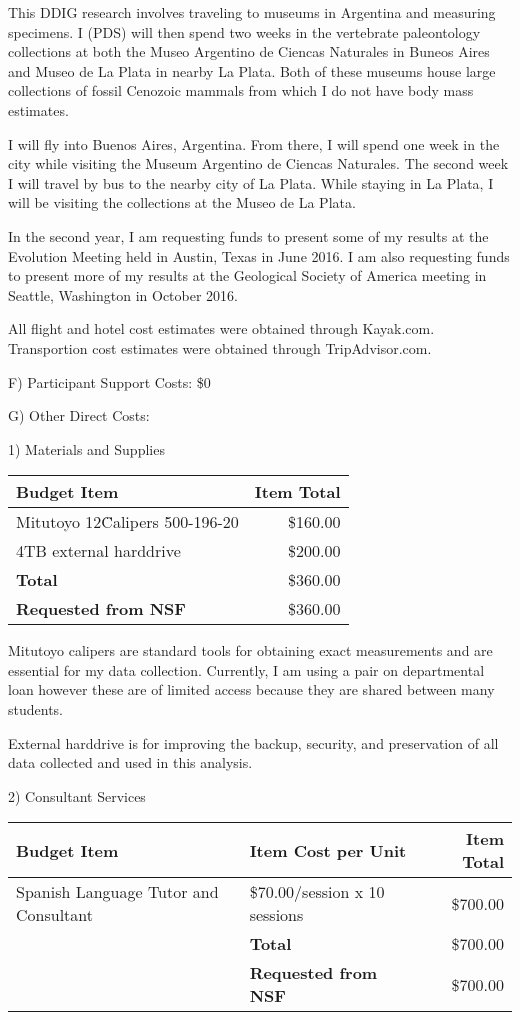 \documentclass[11pt,letterpaper]{article}
\begin{document}
This DDIG research involves traveling to museums in Argentina and measuring specimens. I (PDS) will then spend two weeks in the vertebrate paleontology collections at both the Museo Argentino de Ciencas Naturales in Buneos Aires and Museo de La Plata in nearby La Plata. Both of these museums house large collections of fossil Cenozoic mammals from which I do not have body mass estimates.

I will fly into Buenos Aires, Argentina. From there, I will spend one week in the city while visiting the Museum Argentino de Ciencas Naturales. The second week I will travel by bus to the nearby city of La Plata. While staying in La Plata, I will be visiting the collections at the Museo de La Plata. 

In the second year, I am requesting funds to present some of my results at the Evolution Meeting held in Austin, Texas in June 2016. I am also requesting funds to present more of my results at the Geological Society of America meeting in Seattle, Washington in October 2016.

All flight and hotel cost estimates were obtained through Kayak.com. Transportion cost estimates were obtained through TripAdvisor.com.


F) Participant Support Costs: \$0

G) Other Direct Costs:

1) Materials and Supplies

\begin{tabular}[H]{l r}
  Budget Item & Item Total \\
  \hline
  Mitutoyo 12\" Calipers 500-196-20 & \$160.00 \\
  4TB external harddrive & \$200.00 \\
  \textbf{Total} & \$360.00 \\
  \textbf{Requested from NSF} & \$360.00
\end{tabular}

Mitutoyo calipers are standard tools for obtaining exact measurements and are essential for my data collection. Currently, I am using a pair on departmental loan however these are of limited access because they are shared between many students. 

External harddrive is for improving the backup, security, and preservation of all data collected and used in this analysis.




2) Consultant Services

\begin{tabular}[H]{l l r}
  Budget Item & Item Cost per Unit & Item Total \\
  \hline
  Spanish Language Tutor and Consultant & \$70.00/session x 10 sessions & \$700.00 \\
  & \textbf{Total} & \$700.00 \\
  & \textbf{Requested from NSF} & \$700.00
\end{tabular}
\end{document}
